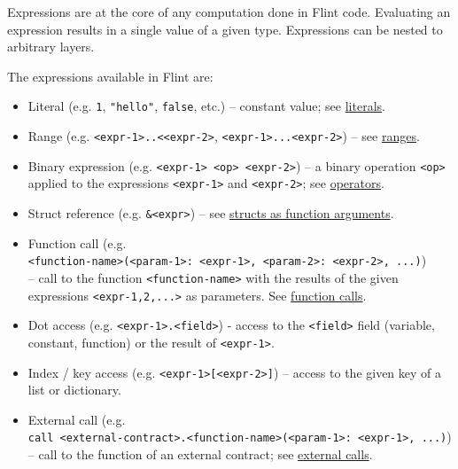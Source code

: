 Expressions are at the core of any computation done in Flint code. Evaluating an expression results in a single value of a given type. Expressions can be nested to arbitrary layers.

The expressions available in Flint are:

\begin{itemize}
	\item Literal (e.g. \texttt{1}, \texttt{"hello"}, \texttt{false}, etc.) – constant value; see \hyperref[sec:appendix-b-literals]{literals}.\\
	\item Range (e.g. \texttt{<expr-1>..<<expr-2>}, \texttt{<expr-1>...<expr-2>}) – see \hyperref[sec:appendix-b-range-types]{ranges}.\\
	\item Binary expression (e.g. \texttt{<expr-1> <op> <expr-2>}) – a binary operation \texttt{<op>} applied to the expressions \texttt{<expr-1>} and \texttt{<expr-2>}; see \hyperref[sec:appendix-b-operators]{operators}.\\
	\item Struct reference (e.g. \texttt{&<expr>}) – see \hyperref[sec:appendix-b-structs-as-function-arguments]{structs as function arguments}.\\
	\item Function call (e.g.\\\texttt{<function-name>(<param-1>: <expr-1>, <param-2>: <expr-2>, ...)})\\– call to the function \texttt{<function-name>} with the results of the given expressions \texttt{<expr-1,2,...>} as parameters. See \hyperref[sec:appendix-b-function-calls]{function calls}.\\
	\item Dot access (e.g. \texttt{<expr-1>.<field>}) - access to the \texttt{<field>} field (variable, constant, function) or the result of \texttt{<expr-1>}.\\
	\item Index / key access (e.g. \texttt{<expr-1>[<expr-2>]}) – access to the given key of a list or dictionary.\\
	\item External call (e.g.\\\texttt{call <external-contract>.<function-name>(<param-1>: <expr-1>, ...)})\\– call to the function of an external contract; see \hyperref[sec:appendix-b-external-calls]{external calls}.\\

\end{itemize}
